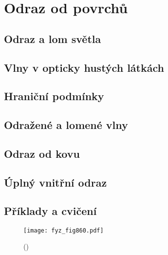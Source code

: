 \setchaptertoc
\chapter{Odraz od povrchů}\label{fyz:IIchapXXXIII}

  \section{Odraz a lom světla}\label{fyz:IIchapXXXIIIsecI}
  \section{Vlny v opticky hustých látkách}\label{fyz:IIchapXXXIIIsecII}
  \section{Hraniční podmínky}\label{fyz:IIchapXXXIIIsecIII}
  \section{Odražené a lomené vlny}\label{fyz:IIchapXXXIIIsecIV}
  \section{Odraz od kovu}\label{fyz:IIchapXXXIIIsecV}
  \section{Úplný vnitřní odraz}\label{fyz:IIchapXXXIIIsecVI}
  \section{Příklady a cvičení}\label{fyz:IIchapXXXIIIsecVII}

    \begin{figure}[ht!] %
      \centering
      \texttt{[image: fyz\_fig860.pdf]}
      \caption{
               (\cite[s.~707]{Feynman02})}
      \label{fyz:fig860}
    \end{figure}

